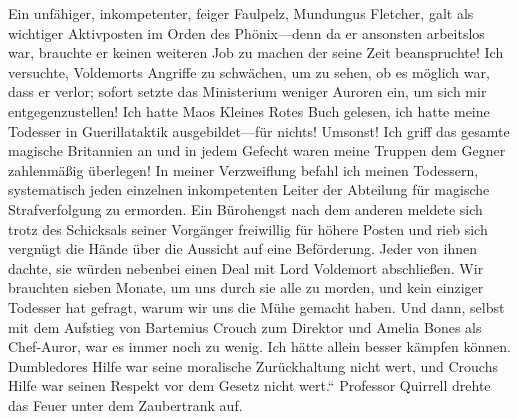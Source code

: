 Ein unfähiger, inkompetenter, feiger Faulpelz, Mundungus Fletcher, galt als wichtiger Aktivposten im Orden des Phönix—denn da er ansonsten arbeitslos war, brauchte er keinen weiteren Job zu machen der seine Zeit beanspruchte! Ich versuchte, Voldemorts Angriffe zu schwächen, um zu sehen, ob es möglich war, dass er verlor; sofort setzte das Ministerium weniger Auroren ein, um sich mir entgegenzustellen! Ich hatte Maos Kleines Rotes Buch gelesen, ich hatte meine Todesser in Guerillataktik ausgebildet—für nichts! Umsonst! Ich griff das gesamte magische Britannien an und in jedem Gefecht waren meine Truppen dem Gegner zahlenmäßig überlegen! In meiner Verzweiflung befahl ich meinen Todessern, systematisch jeden einzelnen inkompetenten Leiter der Abteilung für magische Strafverfolgung zu ermorden. Ein Bürohengst nach dem anderen meldete sich trotz des Schicksals seiner Vorgänger freiwillig für höhere Posten und rieb sich vergnügt die Hände über die Aussicht auf eine Beförderung. Jeder von ihnen dachte, sie würden nebenbei einen Deal mit Lord Voldemort abschließen. Wir brauchten sieben Monate, um uns durch sie alle zu morden, und kein einziger Todesser hat gefragt, warum wir uns die Mühe gemacht haben. Und dann, selbst mit dem Aufstieg von Bartemius Crouch zum Direktor und Amelia Bones als Chef-Auror, war es immer noch zu wenig. Ich hätte allein besser kämpfen können. Dumbledores Hilfe war seine moralische Zurückhaltung nicht wert, und Crouchs Hilfe war seinen Respekt vor dem Gesetz nicht wert.“
Professor Quirrell drehte das Feuer unter dem Zaubertrank auf.

